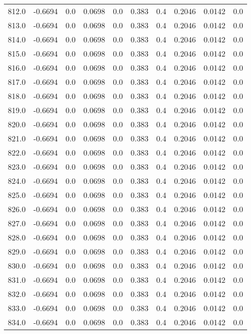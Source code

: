 \begin{longtable}{lrrrrrrrrr}
812.0 & -0.6694 & 0.0 & 0.0698 & 0.0 & 0.383 & 0.4 & 0.2046 & 0.0142 & 0.0 \\
813.0 & -0.6694 & 0.0 & 0.0698 & 0.0 & 0.383 & 0.4 & 0.2046 & 0.0142 & 0.0 \\
814.0 & -0.6694 & 0.0 & 0.0698 & 0.0 & 0.383 & 0.4 & 0.2046 & 0.0142 & 0.0 \\
815.0 & -0.6694 & 0.0 & 0.0698 & 0.0 & 0.383 & 0.4 & 0.2046 & 0.0142 & 0.0 \\
816.0 & -0.6694 & 0.0 & 0.0698 & 0.0 & 0.383 & 0.4 & 0.2046 & 0.0142 & 0.0 \\
817.0 & -0.6694 & 0.0 & 0.0698 & 0.0 & 0.383 & 0.4 & 0.2046 & 0.0142 & 0.0 \\
818.0 & -0.6694 & 0.0 & 0.0698 & 0.0 & 0.383 & 0.4 & 0.2046 & 0.0142 & 0.0 \\
819.0 & -0.6694 & 0.0 & 0.0698 & 0.0 & 0.383 & 0.4 & 0.2046 & 0.0142 & 0.0 \\
820.0 & -0.6694 & 0.0 & 0.0698 & 0.0 & 0.383 & 0.4 & 0.2046 & 0.0142 & 0.0 \\
821.0 & -0.6694 & 0.0 & 0.0698 & 0.0 & 0.383 & 0.4 & 0.2046 & 0.0142 & 0.0 \\
822.0 & -0.6694 & 0.0 & 0.0698 & 0.0 & 0.383 & 0.4 & 0.2046 & 0.0142 & 0.0 \\
823.0 & -0.6694 & 0.0 & 0.0698 & 0.0 & 0.383 & 0.4 & 0.2046 & 0.0142 & 0.0 \\
824.0 & -0.6694 & 0.0 & 0.0698 & 0.0 & 0.383 & 0.4 & 0.2046 & 0.0142 & 0.0 \\
825.0 & -0.6694 & 0.0 & 0.0698 & 0.0 & 0.383 & 0.4 & 0.2046 & 0.0142 & 0.0 \\
826.0 & -0.6694 & 0.0 & 0.0698 & 0.0 & 0.383 & 0.4 & 0.2046 & 0.0142 & 0.0 \\
827.0 & -0.6694 & 0.0 & 0.0698 & 0.0 & 0.383 & 0.4 & 0.2046 & 0.0142 & 0.0 \\
828.0 & -0.6694 & 0.0 & 0.0698 & 0.0 & 0.383 & 0.4 & 0.2046 & 0.0142 & 0.0 \\
829.0 & -0.6694 & 0.0 & 0.0698 & 0.0 & 0.383 & 0.4 & 0.2046 & 0.0142 & 0.0 \\
830.0 & -0.6694 & 0.0 & 0.0698 & 0.0 & 0.383 & 0.4 & 0.2046 & 0.0142 & 0.0 \\
831.0 & -0.6694 & 0.0 & 0.0698 & 0.0 & 0.383 & 0.4 & 0.2046 & 0.0142 & 0.0 \\
832.0 & -0.6694 & 0.0 & 0.0698 & 0.0 & 0.383 & 0.4 & 0.2046 & 0.0142 & 0.0 \\
833.0 & -0.6694 & 0.0 & 0.0698 & 0.0 & 0.383 & 0.4 & 0.2046 & 0.0142 & 0.0 \\
834.0 & -0.6694 & 0.0 & 0.0698 & 0.0 & 0.383 & 0.4 & 0.2046 & 0.0142 & 0.0 \\

\end{longtable}
